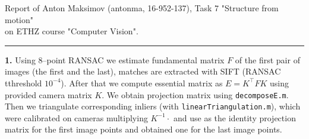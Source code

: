 \documentclass{report}
\begin{document}
\large
Report of Anton Maksimov (antonma, 16-952-137), Task 7 "Structure from motion"\\
 on ETHZ course "Computer Vision".\\
\rule{\linewidth}{1pt}
	\textbf{1.} Using 8--point RANSAC we estimate fundamental matrix $F$ of the first pair of images (the first and the last), matches are extracted with SIFT (RANSAC tthreshold $10^{-4}$). After that we compute essential matrix as $E = K^\top F K$ using provided camera matrix $K$. We obtain projection matrix using \texttt{decomposeE.m}. Then we triangulate corresponding inliers (with \texttt{linearTriangulation.m}), which were calibrated on cameras multiplying $K^{-1}\cdot$ and use as the identity projection matrix for the first image points and obtained one for the last image points.
	
\end{document}
